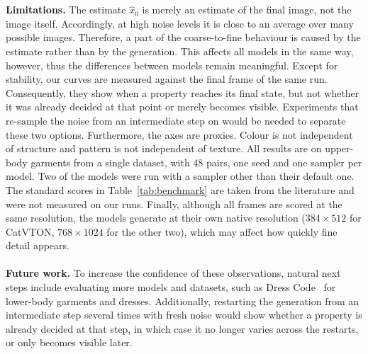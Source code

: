 \\ \\
\textbf{Limitations.} The estimate $\hat{x}_0$ is merely an estimate of the final image, not the image itself. Accordingly, at high noise levels it is close to an average over many possible images. Therefore, a part of the coarse-to-fine behaviour is caused by the estimate rather than by the generation. This affects all models in the same way, however, thus the differences between models remain meaningful. Except for stability, our curves are measured against the final frame of the same run. Consequently, they show when a property reaches its final state, but not whether it was already decided at that point or merely becomes visible. Experiments that re-sample the noise from an intermediate step on would be needed to separate these two options. Furthermore, the axes are proxies. Colour is not independent of structure and pattern is not independent of texture. All results are on upper-body garments from a single dataset, with 48 pairs, one seed and one sampler per model. Two of the models were run with a sampler other than their default one. The standard scores in Table~\ref{tab:benchmark} are taken from the literature and were not measured on our runs. Finally, although all frames are scored at the same resolution, the models generate at their own native resolution ($384 \times 512$ for CatVTON, $768 \times 1024$ for the other two), which may affect how quickly fine detail appears.
\\ \\
\textbf{Future work.} To increase the confidence of these observations, natural next steps include evaluating more models and datasets, such as Dress Code~\cite{morelli2022dresscode} for lower-body garments and dresses. Additionally, restarting the generation from an intermediate step several times with fresh noise would show whether a property is already decided at that step, in which case it no longer varies across the restarts, or only becomes visible later.
